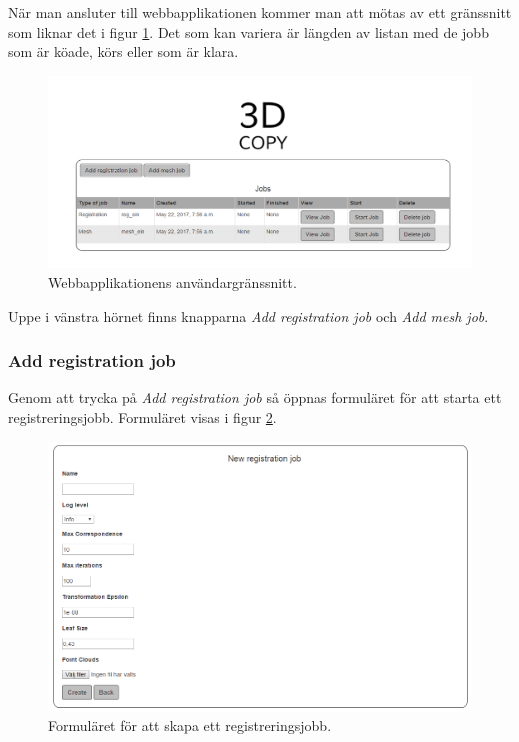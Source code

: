 \documentclass[a4paper,titlepage,12pt]{article}
\begin{document}
	När man ansluter till webbapplikationen kommer man att mötas av ett gränssnitt som liknar det i figur \ref{fig:web_gui}. Det som kan variera är längden av listan med de jobb som är köade, körs eller som är klara.
	
	\begin{figure}[H]
		\centering
		\includegraphics[width=160mm]{images/gui_web.PNG}
		\caption{Webbapplikationens användargränssnitt.}
		\label{fig:web_gui}
	\end{figure}

	Uppe i vänstra hörnet finns knapparna \textit{Add registration job} och \textit{Add mesh job}.
	
	\subsubsection{Add registration job}
	
	Genom att trycka på \textit{Add registration job} så öppnas formuläret för att starta ett registreringsjobb. Formuläret visas i figur \ref{fig:reg_job_form}.
	
	\begin{figure}[H]
		\centering
		\includegraphics[width=160mm]{images/reg_job_form.PNG}
		\caption{Formuläret för att skapa ett registreringsjobb.}
		\label{fig:reg_job_form}
	\end{figure}
\end{document}
